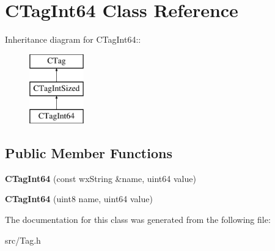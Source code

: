 \section{CTagInt64 Class Reference}
\label{classCTagInt64}
Inheritance diagram for CTagInt64::\begin{figure}[H]
\begin{center}
\leavevmode
\includegraphics[height=3cm]{classCTagInt64}
\end{center}
\end{figure}
\subsection*{Public Member Functions}
\begin{DoxyCompactItemize}
\item 
{\bfseries CTagInt64} (const wxString \&name, uint64 value)\label{classCTagInt64_ace3bce435cd5ad5e57d357aa0c438248}

\item 
{\bfseries CTagInt64} (uint8 name, uint64 value)\label{classCTagInt64_a93904f022c59fe3640139cb0a8568b57}

\end{DoxyCompactItemize}


The documentation for this class was generated from the following file:\begin{DoxyCompactItemize}
\item 
src/Tag.h\end{DoxyCompactItemize}
